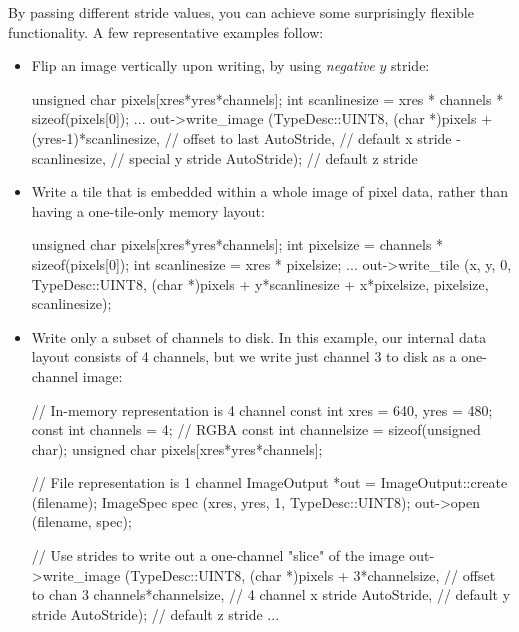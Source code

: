 By passing different stride values, you can achieve some surprisingly
flexible functionality.  A few representative examples follow:

\begin{itemize}
\item Flip an image vertically upon writing, by using \emph{negative}
  $y$ stride:
  \begin{code}
        unsigned char pixels[xres*yres*channels];
        int scanlinesize = xres * channels * sizeof(pixels[0]);
        ...
        out->write_image (TypeDesc::UINT8,
                          (char *)pixels + (yres-1)*scanlinesize,  // offset to last
                          AutoStride,                      // default x stride
                          -scanlinesize,                   // special y stride
                          AutoStride);                     // default z stride
  \end{code}
\item Write a tile that is embedded within a whole image of pixel data,
  rather than having a one-tile-only memory layout:
  \begin{code}
        unsigned char pixels[xres*yres*channels];
        int pixelsize = channels * sizeof(pixels[0]);
        int scanlinesize = xres * pixelsize;
        ...
        out->write_tile (x, y, 0, TypeDesc::UINT8,
                         (char *)pixels + y*scanlinesize + x*pixelsize,
                         pixelsize,
                         scanlinesize);
  \end{code}
\item Write only a subset of channels to disk.  In this example, our
  internal data layout consists of 4 channels, but we write just 
  channel 3 to disk as a one-channel image:
  \begin{code}
        // In-memory representation is 4 channel
        const int xres = 640, yres = 480;
        const int channels = 4;  // RGBA
        const int channelsize = sizeof(unsigned char);
        unsigned char pixels[xres*yres*channels];

        // File representation is 1 channel
        ImageOutput *out = ImageOutput::create (filename);
        ImageSpec spec (xres, yres, 1, TypeDesc::UINT8);
        out->open (filename, spec);

        // Use strides to write out a one-channel "slice" of the image
        out->write_image (TypeDesc::UINT8,
                          (char *)pixels + 3*channelsize,  // offset to chan 3
                          channels*channelsize,            // 4 channel x stride
                          AutoStride,                      // default y stride
                          AutoStride);                     // default z stride
        ...
  \end{code}
\end{itemize}

